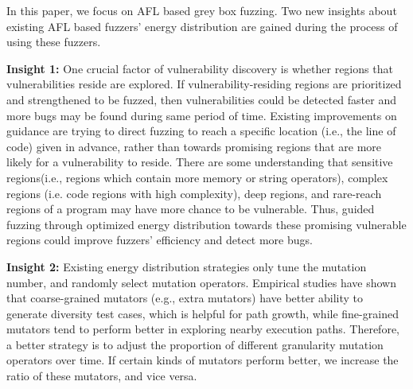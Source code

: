 In this paper, we focus on AFL based grey box fuzzing. Two new insights about existing AFL based fuzzers' energy distribution are gained during the process of using these fuzzers.



\textbf{Insight 1:} One crucial factor of vulnerability discovery is whether regions that vulnerabilities reside are explored. If vulnerability-residing regions are prioritized and strengthened to be fuzzed, then vulnerabilities could be detected faster and more bugs may be found during same period of time. Existing improvements on guidance are trying to direct fuzzing to reach a specific  location (i.e., the line of code) given in advance, rather than towards promising regions that are more likely for a vulnerability to reside. There are some understanding that sensitive regions(i.e., regions which contain more memory or string operators), complex regions (i.e. code regions with high complexity), deep regions, and rare-reach regions of a program may have more chance to be vulnerable. Thus, guided fuzzing through optimized energy distribution towards these promising vulnerable regions could improve fuzzers' efficiency and detect more bugs. 

\textbf{Insight 2:} Existing energy distribution strategies only tune the mutation number, and randomly select mutation operators.
Empirical studies have shown that coarse-grained mutators (e.g., extra mutators) have better ability to generate diversity test cases, which is helpful for path growth, while fine-grained mutators tend to perform better in exploring nearby execution paths.
Therefore, a better strategy is to adjust the proportion of different granularity mutation operators over time. If certain kinds of mutators perform better, we increase the ratio of these mutators, and vice versa.

